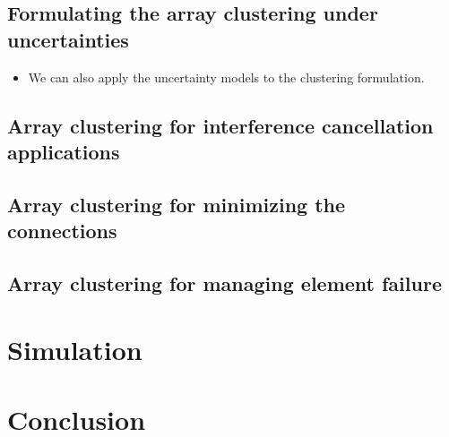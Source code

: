 \documentclass[journal]{IEEEtran}
\begin{document}
\subsection{Formulating the array clustering under uncertainties} 
\begin{itemize}
\item We can also apply the uncertainty models to the clustering formulation.
\end{itemize}
\subsection{Array clustering for interference cancellation applications} 
\subsection{Array clustering for minimizing the connections} 
\subsection{Array clustering for managing element failure} 


\section{Simulation}\label{sec:sim}
\section{Conclusion}
\label{sec:conclusion}


% 
% 
\end{document}
